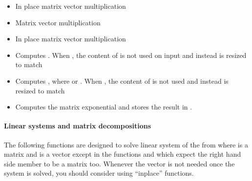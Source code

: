 \begin{itemize}
\item {} 
  \sshortdescribe In place matrix vector multiplication  

\item {} 
  \sshortdescribe Matrix vector multiplication  

\item {} 
  \sshortdescribe In place matrix vector multiplication  
  
\item {} 
  \sshortdescribe Computes . When , the
  content of  is not used on input and instead  is resized to
  match 

\item {} \sshortdescribe Computes , where  or . When
  , the content of  is not used and instead  is resized
  to match 
  
\item {}
  \sshortdescribe Computes the matrix exponential  and stores the
  result in .
\end{itemize}

\paragraph{Linear systems and matrix decompositions}

The following functions are designed to solve linear system of the from  where  is a matrix and  is a vector except in the
functions  and 
which expect the right hand side member to be a matrix too. Whenever the
vector  is not needed once the system is solved, you should consider
using ``inplace'' functions.

